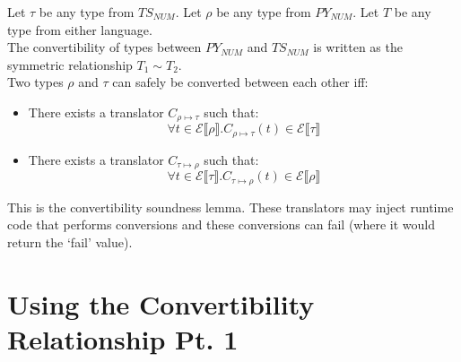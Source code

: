 \documentclass{article}
\newcommand{\denoteset}[2]{\mathcal{#1} \llbracket #2 \rrbracket}
\begin{document}
	Let $\tau$ be any type from $TS_{NUM}$. Let $\rho$ be any type from $PY_{NUM}$. Let $T$ be any type from either language.\\
	
	The convertibility of types between $PY_{NUM}$ and $TS_{NUM}$ is written as the symmetric relationship $T_1 \sim T_2$.\\
	
	Two types $\rho$ and $\tau$ can safely be converted between each other iff:
	\begin{itemize}
		\item There exists a translator $C_{\rho \mapsto \tau}$ such that:
		\[
			\forall t \in \denoteset{E}{\rho}. C_{\rho \mapsto \tau}(t) \in \denoteset{E}{\tau}
		\]
		\item There exists a translator $C_{\tau \mapsto \rho}$ such that:
		\[
			\forall t \in \denoteset{E}{\tau}. C_{\tau \mapsto \rho}(t) \in \denoteset{E}{\rho}
		\]
	\end{itemize}
	This is the convertibility soundness lemma. These translators may inject runtime code that performs conversions and these conversions can fail (where it would return the `fail' value).


\section{Using the Convertibility Relationship Pt. 1}

		
	\printbibliography[heading=bibintoc]
\end{document}
